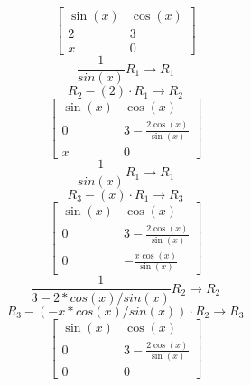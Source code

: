\documentclass{article}
\begin{document}
$$\left[\begin{matrix}\sin{\left(x \right)} & \cos{\left(x \right)}\\2 & 3\\x & 0\end{matrix}\right]$$
$$\frac1{sin(x)} R_{1} \rightarrow R_{1}$$
$$R_{2} - (2) \cdot R_{1} \rightarrow R_{2}$$
$$\left[\begin{matrix}\sin{\left(x \right)} & \cos{\left(x \right)}\\0 & 3 - \frac{2 \cos{\left(x \right)}}{\sin{\left(x \right)}}\\x & 0\end{matrix}\right]$$
$$\frac1{sin(x)} R_{1} \rightarrow R_{1}$$
$$R_{3} - (x) \cdot R_{1} \rightarrow R_{3}$$
$$\left[\begin{matrix}\sin{\left(x \right)} & \cos{\left(x \right)}\\0 & 3 - \frac{2 \cos{\left(x \right)}}{\sin{\left(x \right)}}\\0 & - \frac{x \cos{\left(x \right)}}{\sin{\left(x \right)}}\end{matrix}\right]$$
$$\frac1{3 - 2*cos(x)/sin(x)} R_{2} \rightarrow R_{2}$$
$$R_{3} - (-x*cos(x)/sin(x)) \cdot R_{2} \rightarrow R_{3}$$
$$\left[\begin{matrix}\sin{\left(x \right)} & \cos{\left(x \right)}\\0 & 3 - \frac{2 \cos{\left(x \right)}}{\sin{\left(x \right)}}\\0 & 0\end{matrix}\right]$$
\end{document}
